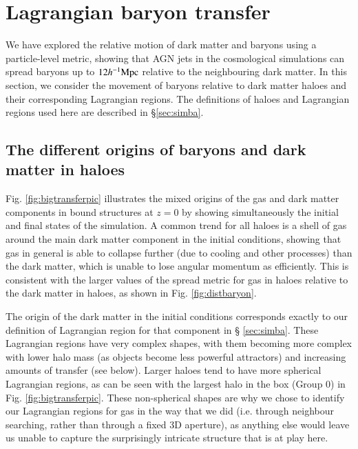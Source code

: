 \section{Lagrangian baryon transfer}
\label{sec:transfer}

We have explored the relative motion of dark matter and baryons using a
particle-level metric, showing that AGN jets in the \simba{} cosmological
simulations can spread baryons up to $12h^{-1}{\rm Mpc}{}$ relative to the neighbouring
dark matter. In this section, we consider the movement of baryons relative to
dark matter haloes and their corresponding Lagrangian regions. The definitions of
haloes and Lagrangian regions used here are described in \S \ref{sec:simba}.

\subsection{The different origins of baryons and dark matter in haloes}

Fig. \ref{fig:bigtransferpic} illustrates the mixed origins of the gas and
dark matter components in bound structures at $z=0$ by showing simultaneously
the initial and final states of the simulation. A common trend for all haloes
is a shell of gas around the main dark matter component in the initial
conditions, showing that gas in general is able to collapse further (due to
cooling and other processes) than the dark matter, which is unable to lose
angular momentum as efficiently. This is consistent with the larger values of
the spread metric for gas in haloes relative to the dark matter in haloes, as
shown in Fig. \ref{fig:distbaryon}.

The origin of the dark matter in the initial conditions corresponds
exactly to our definition of Lagrangian region for that component in \S
\ref{sec:simba}. These Lagrangian regions have very complex shapes, with them
becoming more complex with lower halo mass (as objects become less powerful
attractors) and increasing amounts of transfer (see below). Larger haloes tend
to have more spherical Lagrangian regions, as can be seen with the largest
halo in the box (Group 0) in Fig. \ref{fig:bigtransferpic}. These
non-spherical shapes are why we chose to identify our Lagrangian regions for
gas in the way that we did (i.e. through neighbour searching, rather than
through a fixed 3D aperture), as anything else would leave us unable to
capture the surprisingly intricate structure that is at play here.

